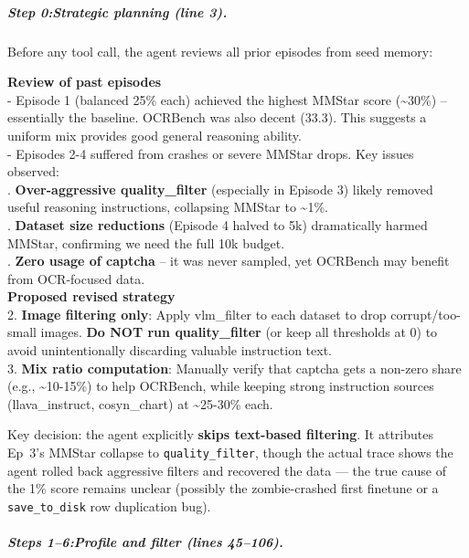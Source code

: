 \subparagraph{Step 0:Strategic planning (line 3).}
Before any tool call, the agent reviews all prior episodes from seed memory:

\begin{agentthought}[title={Agent Thought}]
\small\ttfamily
\textbf{Review of past episodes}\\
- Episode 1 (balanced 25\% each) achieved the highest MMStar score (\textasciitilde30\%) -- essentially the baseline. OCRBench was also decent (33.3). This suggests a uniform mix provides good general reasoning ability.\\
- Episodes 2-4 suffered from crashes or severe MMStar drops. Key issues observed:\\
. \textbf{Over-aggressive quality\_filter} (especially in Episode 3) likely removed useful reasoning instructions, collapsing MMStar to \textasciitilde1\%.\\
. \textbf{Dataset size reductions} (Episode 4 halved to 5k) dramatically harmed MMStar, confirming we need the full 10k budget.\\
. \textbf{Zero usage of captcha} -- it was never sampled, yet OCRBench may benefit from OCR-focused data.\\[6pt]
\textbf{Proposed revised strategy}\\
2. \textbf{Image filtering only}: Apply vlm\_filter to each dataset to drop corrupt/too-small images. \textbf{Do NOT run quality\_filter} (or keep all thresholds at 0) to avoid unintentionally discarding valuable instruction text.\\
3. \textbf{Mix ratio computation}: Manually verify that captcha gets a non-zero share (e.g., \textasciitilde10-15\%) to help OCRBench, while keeping strong instruction sources (llava\_instruct, cosyn\_chart) at \textasciitilde25-30\% each.
\end{agentthought}

\noindent Key decision: the agent explicitly \textbf{skips text-based filtering}. It attributes Ep~3's MMStar collapse to \texttt{quality\_filter}, though the actual trace shows the agent rolled back aggressive filters and recovered the data --- the true cause of the 1\% score remains unclear (possibly the zombie-crashed first finetune or a \texttt{save\_to\_disk} row duplication bug).

\subparagraph{Steps 1--6:Profile and filter (lines 45--106).}
\mbox{}

